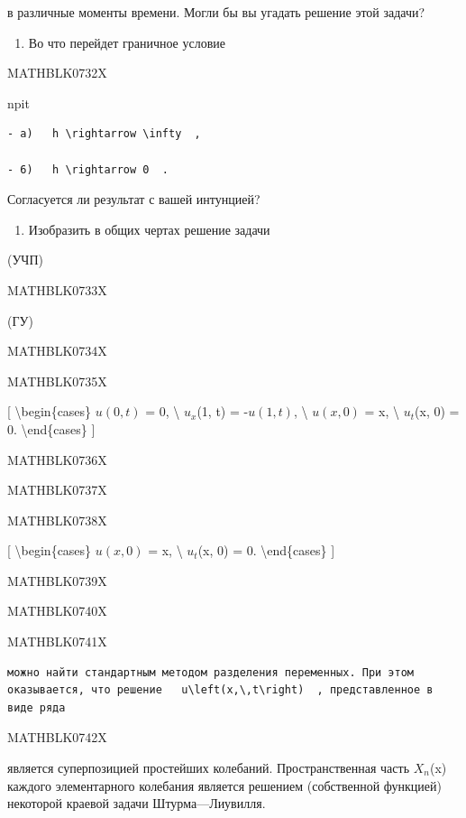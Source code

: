 \documentclass[
]{article}
\providecommand{\tightlist}{%
  \setlength{\itemsep}{0pt}\setlength{\parskip}{0pt}}
\begin{document}
{{в различные моменты времени. Могли бы вы угадать решение этой задачи?

\begin{enumerate}
\def\labelenumi{\arabic{enumi}.}
\setcounter{enumi}{2}
\tightlist
\item
  Во что перейдет граничное условие
\end{enumerate}

MATHBLK0732X

npit

\begin{verbatim}
- a)   h \rightarrow \infty  ,

- 6)   h \rightarrow 0  .
\end{verbatim}

Согласуется ли результат с вашей интунцией?

\begin{enumerate}
\def\labelenumi{\arabic{enumi}.}
\setcounter{enumi}{3}
\tightlist
\item
  Изобразить в общих чертах решение задачи
\end{enumerate}

(УЧП)

MATHBLK0733X

(ГУ)

MATHBLK0734X

MATHBLK0735X

{[} \textbackslash begin\{cases\} \(u(0, t)\) = 0, \textbackslash{}
\(u_x\)(1, t) = -\(u(1, t)\), \textbackslash{} \(u(x, 0)\) = x,
\textbackslash{} \(u_t\)(x, 0) = 0. \textbackslash end\{cases\} {]}

MATHBLK0736X

MATHBLK0737X

MATHBLK0738X

{[} \textbackslash begin\{cases\} \(u(x, 0)\) = x, \textbackslash{}
\(u_t\)(x, 0) = 0. \textbackslash end\{cases\} {]}

MATHBLK0739X

MATHBLK0740X

MATHBLK0741X

\begin{verbatim}
можно найти стандартным методом разделения переменных. При этом оказывается, что решение   u\left(x,\,t\right)  , представленное в виде ряда
\end{verbatim}

MATHBLK0742X

является суперпозицией простейших колебаний. Пространственная часть
\(X_n\)(x) каждого элементарного колебания является решением
(собственной функцией) некоторой краевой задачи Штурма---Лиувилля.

}}
\end{document}
